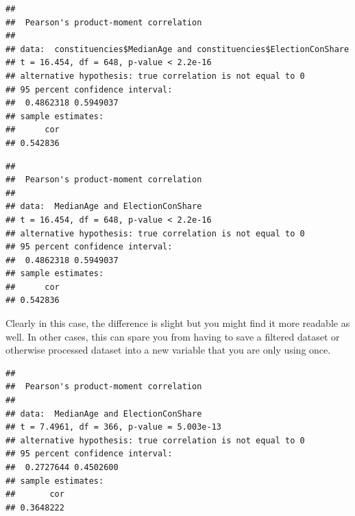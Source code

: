 \documentclass[
]{book}
\newenvironment{Shaded}{\begin{snugshade}}{\end{snugshade}}
\newcommand{\CommentTok}[1]{\textcolor[rgb]{0.56,0.35,0.01}{\textit{#1}}}
\newcommand{\KeywordTok}[1]{\textcolor[rgb]{0.13,0.29,0.53}{\textbf{#1}}}
\newcommand{\NormalTok}[1]{#1}
\newcommand{\OperatorTok}[1]{\textcolor[rgb]{0.81,0.36,0.00}{\textbf{#1}}}
\newcommand{\StringTok}[1]{\textcolor[rgb]{0.31,0.60,0.02}{#1}}
\begin{document}
\begin{verbatim}
## 
## 	Pearson's product-moment correlation
## 
## data:  constituencies$MedianAge and constituencies$ElectionConShare
## t = 16.454, df = 648, p-value < 2.2e-16
## alternative hypothesis: true correlation is not equal to 0
## 95 percent confidence interval:
##  0.4862318 0.5949037
## sample estimates:
##      cor 
## 0.542836
\end{verbatim}

\begin{Shaded}
\end{Shaded}

\begin{verbatim}
## 
## 	Pearson's product-moment correlation
## 
## data:  MedianAge and ElectionConShare
## t = 16.454, df = 648, p-value < 2.2e-16
## alternative hypothesis: true correlation is not equal to 0
## 95 percent confidence interval:
##  0.4862318 0.5949037
## sample estimates:
##      cor 
## 0.542836
\end{verbatim}

Clearly in this case, the difference is slight but you might find it more readable as well. In other cases, this can spare you from having to save a filtered dataset or otherwise processed dataset into a new variable that you are only using once.

\begin{Shaded}
\end{Shaded}

\begin{verbatim}
## 
## 	Pearson's product-moment correlation
## 
## data:  MedianAge and ElectionConShare
## t = 7.4961, df = 366, p-value = 5.003e-13
## alternative hypothesis: true correlation is not equal to 0
## 95 percent confidence interval:
##  0.2727644 0.4502600
## sample estimates:
##       cor 
## 0.3648222
\end{verbatim}
\end{document}
